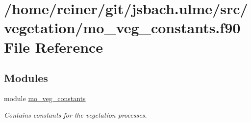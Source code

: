 \hypertarget{mo__veg__constants_8f90}{}\section{/home/reiner/git/jsbach.ulme/src/vegetation/mo\+\_\+veg\+\_\+constants.f90 File Reference}
\label{mo__veg__constants_8f90}
\subsection*{Modules}
\begin{DoxyCompactItemize}
\item 
module \hyperlink{namespacemo__veg__constants}{mo\+\_\+veg\+\_\+constants}
\begin{DoxyCompactList}\small\item\em Contains constants for the vegetation processes. \end{DoxyCompactList}\end{DoxyCompactItemize}
